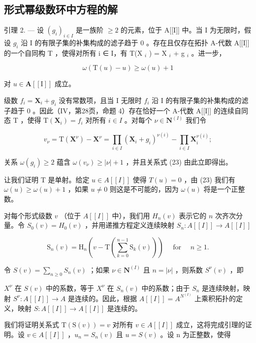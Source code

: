\subsection{形式幂级数环中方程的解}

引理 2. --- 设 \((g_i)_{i \in I}\) 是一族阶 \(\geqslant 2\) 的元素，位于 A{[}{[}I{]}{]} 中。当 I 为无限时，假设 \(g_i\) 沿 I 的有限子集的补集构成的滤子趋于 0 。存在且仅存在拓扑 A-代数 A{[}{[}I{]}{]} 的一个自同构 T ，使得对所有 i ∈ I，有 T(X \(_i\) ) = X \(_i\) + g \(_i\) 。进一步，

\[
\omega (\mathrm{T} (u) - u) \geqslant \omega (u) + 1\tag{23}
\]

对 \(u \in \mathbf{A}[[\mathrm{I}]]\) 成立。

级数 \(f_{i} = \mathbf{X}_{i} + g_{i}\) 没有常数项，且当 I 无限时 \(f_{i}\) 沿 I 的有限子集的补集构成的滤子趋于 0 。因此（IV，第28页，命题 4）存在恰好一个 A-代数 A{[}{[}I{]}{]} 的连续自同态 T ，使得 \(\mathrm{T}(\mathbf{X}_i) = f_i\) 对所有 \(i \in I\) 。对每个 \(\nu \in \mathbf{N}^{(I)}\) 我们令

\[
v _ {\nu} = \mathrm{T} \left(\mathbf {X} ^ {\nu}\right) - \mathbf {X} ^ {\nu} = \prod_ {i \in I} \left(\mathbf {X} _ {i} + g _ {i}\right) ^ {\nu (i)} - \prod_ {i \in I} \mathbf {X} _ {i} ^ {\nu (i)};
\]

关系 \(\omega(g_i) \geqslant 2\) 蕴含 \(\omega(v_\nu) \geqslant |\nu| + 1\) ，并且关系式 (23) 由此立即得出。

让我们证明 T 是单射。给定 \(u \in A[[I]]\) 使得 \(T(u) = 0\) ，由 (23) 我们有 \(\omega(u) \geqslant \omega(u) + 1\) ，如果 \(u \neq 0\) 则这是不可能的，因为 \(\omega(u)\) 将是一个正整数。

对每个形式级数 \(v\) （位于 \(A[[I]]\) 中），我们用 \(H_n(v)\) 表示它的 \(n\) 次齐次分量。令 \(S_0(v) = H_0(v)\) ，并用递推方程定义连续映射 \(S_n: A[[I]] \to A[[I]]\)

\[
\mathrm{S} _ {n} (v) = \mathrm{H} _ {n} \left(v - \mathrm{T} \left(\sum_ {k = 0} ^ {n - 1} \mathrm{S} _ {k} (v)\right)\right) \quad \text { for } \quad n \geqslant 1.\tag{24}
\]

令 \(S(v) = \sum_{n \geqslant 0} S_n(v)\) ；如果 \(\nu \in \mathbf{N}^{(I)}\) 且 \(n = |\nu|\) ，则系数 \(S^{\nu}(v)\) ，即

\(X^{\nu}\) 在 \(S(v)\) 中的系数，等于 \(X^{\nu}\) 在 \(S_{n}(v)\) 中的系数；由于 \(S_{n}\) 是连续映射，映射 \(S^{\nu}: A[[I]] \to A\) 是连续的。因此，根据 \(A[[I]] = A^{N^{(I)}}\) 上乘积拓扑的定义，映射 \(S: A[[I]] \to A[[I]]\) 是连续的。

我们将证明关系式 \(\mathrm{T}(\mathrm{S}(v)) = v\) 对所有 \(v \in A[[I]]\) 成立，这将完成引理的证明。设 \(v \in A[[I]]\) ，\(u_n = S_n(v)\) 且 \(u = S(v)\) 。设 n 为正整数，使得

